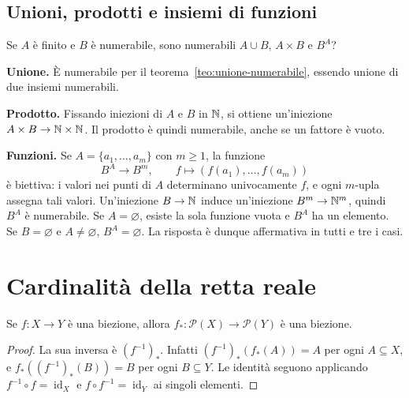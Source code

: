 \subsection{Unioni, prodotti e insiemi di funzioni}
\begin{esercizio}
Se $A$ è finito e $B$ è numerabile, sono numerabili $A\cup B$, $A\times B$ e $B^A$?
\end{esercizio}
\begin{svolgimento}
\textbf{Unione.} È numerabile per il teorema~\ref{teo:unione-numerabile}, essendo unione di due insiemi numerabili.

\textbf{Prodotto.} Fissando iniezioni di $A$ e $B$ in $\mathbb{N}$, si ottiene un'iniezione $A\times B\to\mathbb{N}\times\mathbb{N}$. Il prodotto è quindi numerabile, anche se un fattore è vuoto.

\textbf{Funzioni.} Se $A=\{a_1,\ldots,a_m\}$ con $m\ge1$, la funzione
\[
B^A\longrightarrow B^m,\qquad f\longmapsto(f(a_1),\ldots,f(a_m))
\]
è biettiva: i valori nei punti di $A$ determinano univocamente $f$, e ogni $m$-upla assegna tali valori. Un'iniezione $B\to\mathbb{N}$ induce un'iniezione $B^m\to\mathbb{N}^m$, quindi $B^A$ è numerabile. Se $A=\varnothing$, esiste la sola funzione vuota e $B^A$ ha un elemento. Se $B=\varnothing$ e $A\ne\varnothing$, $B^A=\varnothing$. La risposta è dunque affermativa in tutti e tre i casi.
\end{svolgimento}

\section{Cardinalità della retta reale}
\begin{proposizione}
Se $f:X\to Y$ è una biezione, allora $f_*:\mathcal P(X)\to\mathcal P(Y)$ è una biezione.
\end{proposizione}
\begin{proof}
La sua inversa è $(f^{-1})_*$. Infatti $(f^{-1})_*(f_*(A))=A$ per ogni $A\subseteq X$, e $f_*((f^{-1})_*(B))=B$ per ogni $B\subseteq Y$. Le identità seguono applicando $f^{-1}\circ f=\operatorname{id}_X$ e $f\circ f^{-1}=\operatorname{id}_Y$ ai singoli elementi.
\end{proof}

